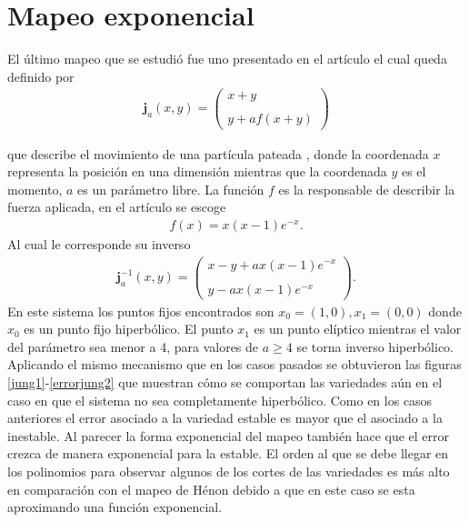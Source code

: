 \section{Mapeo exponencial}
El último mapeo que se estudió fue uno presentado en el artículo \citep{Jung} el cual queda definido por 
\begin{eqnarray}
\mathbf{j}_{a}(x,y)=\left(\begin{array}{lcc}
             x+y\\
             \\ y+af(x+y)
             \end{array}\right)
\label{Jung}
\end{eqnarray}

que describe el movimiento de una partícula pateada , donde la coordenada $x$ representa la posición en una dimensión mientras que la coordenada $y$ es el momento, $a$ es un parámetro libre. La función $f$ es la responsable de describir la fuerza aplicada, en el artículo \cite{Jung} se escoge
\begin{eqnarray*}
f(x)=x(x-1)e^{-x}.
\end{eqnarray*}
Al cual le corresponde su inverso
\begin{eqnarray}
\mathbf{j}^{-1}_{a}(x,y)=\left(\begin{array}{lcc}
             x-y+ax(x-1)e^{-x}\\
             \\ y-ax(x-1)e^{-x}
             \end{array}\right).
             \label{jungI}
\end{eqnarray}
En este sistema los puntos fijos encontrados son $x_{0}=(1,0),x_{1}=(0,0)$ donde $x_{0}$ es un punto fijo hiperbólico. El punto $x_{1}$ es un punto elíptico mientras el valor del parámetro sea menor a 4, para valores de $a \geq 4$ se torna inverso hiperbólico.\\

Aplicando el mismo mecanismo que en los casos pasados se obtuvieron las figuras \ref{jung1}-\ref{errorjung2} que muestran cómo se comportan las variedades aún en el caso en que el sistema no sea completamente hiperbólico. Como en los casos anteriores el error asociado a la variedad estable es mayor que el asociado a la inestable. Al parecer la forma exponencial del mapeo también hace que el error crezca de manera exponencial para la estable. El orden al que se debe llegar en los polinomios para observar algunos de los cortes de las variedades es más alto en comparación con el mapeo de Hénon debido a que en este caso se esta aproximando una función exponencial.

